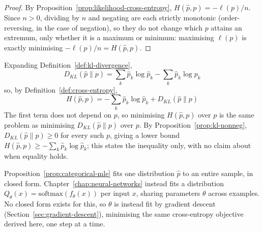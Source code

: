 		\begin{proof}
			By Proposition~\ref{prop:likelihood-cross-entropy}, $H(\hat p,p) = -\ell(p)/n$. Since $n>0$, dividing by $n$ and negating are each strictly monotonic (order-reversing, in the case of negation), so they do not change which $p$ attains an extremum, only whether it is a maximum or minimum: maximising $\ell(p)$ is exactly minimising $-\ell(p)/n=H(\hat p,p)$.
		\end{proof}
		
		\begin{remark}
			\label{rem:cross-entropy-kl}
			Expanding Definition~\ref{def:kl-divergence},
			\[
				D_{KL}(\hat p\|p) = \sum_k\hat p_k\log\hat p_k - \sum_k\hat p_k\log p_k
			\]
			so, by Definition~\ref{def:cross-entropy},
			\[
				H(\hat p,p) = -\sum_k\hat p_k\log\hat p_k + D_{KL}(\hat p\|p)
			\]
			The first term does not depend on $p$, so minimising $H(\hat p,p)$ over $p$ is the same problem as minimising $D_{KL}(\hat p\|p)$ over $p$. By Proposition~\ref{prop:kl-nonneg}, $D_{KL}(\hat p\|p)\ge0$ for every such $p$, giving a lower bound $H(\hat p,p)\ge-\sum_k\hat p_k\log\hat p_k$; this states the inequality only, with no claim about when equality holds.
		\end{remark}
		
		\begin{remark}
			\label{rem:categorical-mle-to-network}
			Proposition~\ref{prop:categorical-mle} fits one distribution $\hat p$ to an entire sample, in closed form. Chapter~\ref{chap:neural-networks} instead fits a distribution $Q_\theta(x)=\mathrm{softmax}(f_\theta(x))$ per input $x$, sharing parameters $\theta$ across examples. No closed form exists for this, so $\theta$ is instead fit by gradient descent (Section~\ref{sec:gradient-descent}), minimising the same cross-entropy objective derived here, one step at a time.
		\end{remark}
